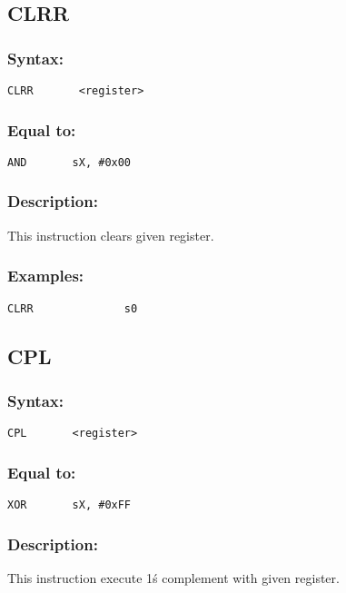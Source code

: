     \subsection{CLRR}
        \subsubsection{Syntax:}
        {
            \usecodefont
            \verb'CLRR       <register>'
        }

        \subsubsection{Equal to:}
        {
            \usecodefont
            \verb'AND       sX, #0x00'
        }

        \subsubsection{Description:}
            This instruction clears given register.

        \subsubsection{Examples:}
        {
            \usecodefont
            \verb'CLRR              s0'\\
        }

    \subsection{CPL}
        \subsubsection{Syntax:}
        {
            \usecodefont
            \verb'CPL       <register>'
        }

        \subsubsection{Equal to:}
        {
            \usecodefont
            \verb'XOR       sX, #0xFF'
        }

        \subsubsection{Description:}
            This instruction execute 1\'s complement with given register.

